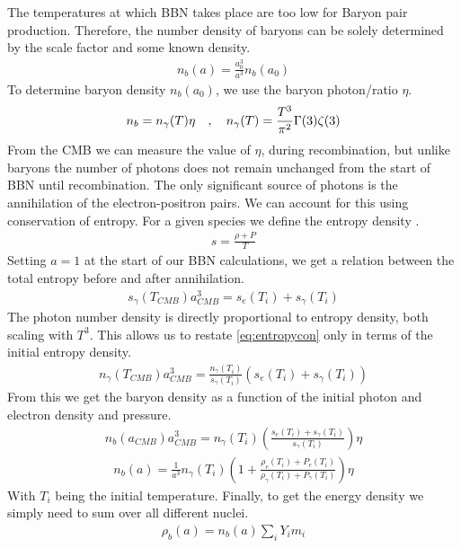 The temperatures at which BBN takes place are too low for Baryon pair production. Therefore, the number density of baryons can be solely determined by the scale factor and some known density. 
\begin{align}
    n_b(a)=\frac{a_0^3}{a^3}n_{b}(a_0)
\end{align}
To determine baryon density $n_{b}(a_0)$, we use the baryon photon/ratio $\eta$. 
\begin{align}
    n_b=n_\gamma(T) \eta \quad , \quad n_\gamma(T)=\frac{T^3}{\pi^2}\Gamma(3)\zeta(3)
\end{align}
From the CMB we can measure the value of $\eta$, during recombination, but unlike baryons the number of photons does not remain unchanged from the start of BBN until recombination. The only significant source of photons is the annihilation of the electron-positron pairs. We can account for this using conservation of entropy. For a given species we define the entropy density \cite[(3.91)]{kolbturner}.
\begin{align}
    s=\frac{\rho+P}{T}
\end{align}
Setting $a=1$ at the start of our BBN calculations, we get a relation between the total entropy before and after annihilation.
\begin{align}
     s_{\gamma}(T_{CMB})a_{CMB}^3= s_e(T_{i})+s_{\gamma}(T_{i})
    \label{eq:entropycon}
\end{align}
The photon number density is directly proportional to entropy density, both scaling with $T^3$. This allows us to restate \eqref{eq:entropycon} only in terms of the initial entropy density.
\begin{align}
    n_{\gamma}(T_{CMB})a_{CMB}^3 = \frac{n_\gamma(T_{i})}{s_{\gamma}(T_{i})}\left(s_e(T_{i})+s_{\gamma}(T_{i})\right)
\end{align}
From this we get the baryon density as a function of the initial photon and electron density and pressure.
\begin{align}
    n_b(a_{CMB}){a_{CMB}^3}=n_\gamma(T_{i}) \left(\frac{s_e(T_{i})+s_{\gamma}(T_{i})}{s_{\gamma}(T_{i})}\right)\eta
\end{align}
\begin{align}
    n_b(a)=\frac{1}{a^3}n_\gamma(T_{i}) \left(1+\frac{\rho_e(T_{i})+P_{e}(T_{i})}{\rho_{\gamma}(T_{i})+P_{\gamma}(T_{i})}\right)\eta
    \label{n_b}
\end{align}
With $T_i$ being the initial temperature. Finally, to get the energy density we simply need to sum over all different nuclei. 
\begin{align}
    \rho_b(a)=n_b(a)\sum_{i}^{}Y_i m_i
    \label{rhob}
\end{align}
